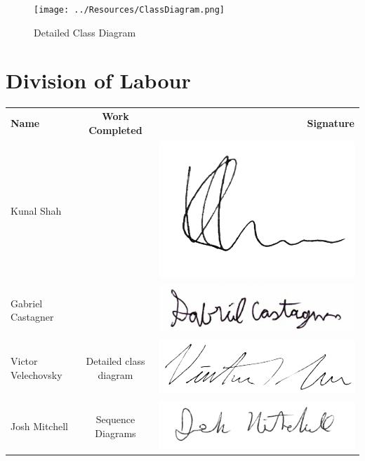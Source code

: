 \documentclass[]{article}
\begin{document}
\begin{figure}[H]
	\texttt{[image: ../Resources/ClassDiagram.png]}
	\caption{Detailed Class Diagram}
\end{figure}

\newpage

\appendix
\section{Division of Labour}
\label{sec:division_of_labour}
\begin{tabular}{l c r}
	\textbf{Name} & \textbf{Work Completed} & \textbf{Signature} \\
	
	Kunal Shah &  & 
	\includegraphics[scale=0.2]{../Resources/Signature/Kunal-Sig.png} \\
	
	Gabriel Castagner &  &
	\includegraphics[scale=0.2]{../Resources/Signature/Gabe-Sig.png} \\
	
	Victor Velechovsky & Detailed class diagram & 
	\includegraphics[scale=0.3]{../Resources/Signature/Vic-Sig.png} \\
	
	Josh Mitchell & Sequence Diagrams & 
	\includegraphics[scale=0.2]{../Resources/Signature/Josh-Sig.png} \\
\end{tabular}
\end{document}
